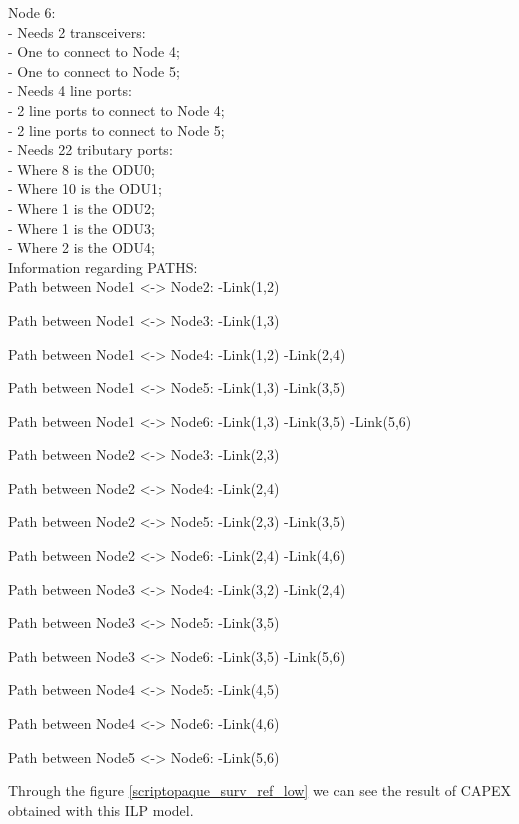 Node 6:\\
\quad - Needs 2 transceivers:\\
\quad \qquad - One to connect to Node 4;\\
\quad \qquad - One to connect to Node 5;\\
\quad - Needs 4 line ports:\\
\quad \qquad - 2 line ports to connect to Node 4;\\
\quad \qquad - 2 line ports to connect to Node 5;\\
\quad - Needs 22 tributary ports:\\
\quad \qquad - Where 8 is the ODU0;\\
\quad \qquad - Where 10 is the ODU1;\\
\quad \qquad - Where 1 is the ODU2;\\
\quad \qquad - Where 1 is the ODU3;\\
\quad \qquad - Where 2 is the ODU4;\\

Information regarding PATHS:\\

Path between Node1 <-> Node2:
\quad-Link(1,2)

Path between Node1 <-> Node3:
\quad-Link(1,3)

Path between Node1 <-> Node4:
\quad-Link(1,2) -Link(2,4)

Path between Node1 <-> Node5:
\quad-Link(1,3) -Link(3,5)

Path between Node1 <-> Node6:
\quad-Link(1,3) -Link(3,5) -Link(5,6)

Path between Node2 <-> Node3:
\quad-Link(2,3)

Path between Node2 <-> Node4:
\quad-Link(2,4)

Path between Node2 <-> Node5:
\quad-Link(2,3) -Link(3,5)

Path between Node2 <-> Node6:
\quad-Link(2,4) -Link(4,6)

Path between Node3 <-> Node4:
\quad-Link(3,2) -Link(2,4)

Path between Node3 <-> Node5:
\quad-Link(3,5)

Path between Node3 <-> Node6:
\quad-Link(3,5) -Link(5,6)

Path between Node4 <-> Node5:
\quad-Link(4,5)

Path between Node4 <-> Node6:
\quad-Link(4,6)

Path between Node5 <-> Node6:
\quad-Link(5,6)

\vspace{11pt}
Through the figure \ref{scriptopaque_surv_ref_low} we can see the result of CAPEX obtained with this ILP model.\\

